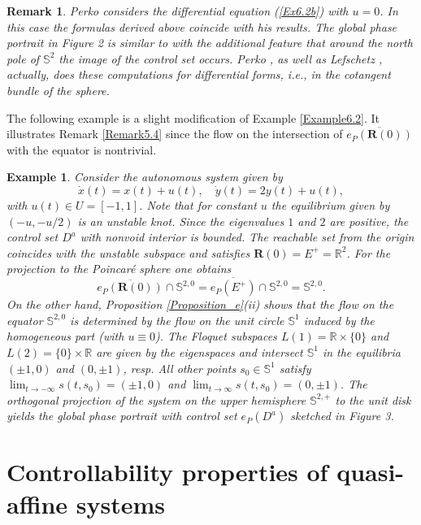 \documentclass{siamltex}%
\newtheorem{example}[theorem]{Example}
\newtheorem{remark}[theorem]{Remark}
\begin{document}
\begin{remark}
Perko \cite{Perko} considers the differential equation (\ref{Ex6.2b}) with
$u=0$. In this case the formulas derived above coincide with his results. The
global phase portrait in Figure 2 is similar to \cite[Figure 5 on p.
275]{Perko} with the additional feature that around the north pole of
$\mathbb{S}^{2}$ the image of the control set occurs. Perko \cite{Perko}, as
well as Lefschetz \cite[pp. 202]{Lefschetz}, actually, does these computations
for differential forms, i.e., in the cotangent bundle of the sphere.
\end{remark}

The following example is a slight modification of Example \ref{Example6.2}. It
illustrates Remark \ref{Remark5.4} since the flow on the intersection of
$\overline{e_{P}(\mathbf{R}(0))}$ with the equator is nontrivial.

\begin{example}
\label{Example6.3}Consider the autonomous system given by%
\[
\dot{x}(t)=x(t)+u(t),\quad\dot{y}(t)=2y(t)+u(t),
\]
with $u(t)\in U=[-1,1]$. Note that for constant $u$ the equilibrium given by
$(-u,-u/2)$ is an unstable knot. Since the eigenvalues $1$ and $2$ are
positive, the control set $D^{a}$ with nonvoid interior is bounded. The
reachable set from the origin coincides with the unstable subspace and
satisfies $\mathbf{R}(0)=E^{+}=\mathbb{R}^{2}$. For the projection to the
Poincar\'{e} sphere one obtains%
\[
\overline{e_{P}(\mathbf{R}(0))}\cap\mathbb{S}^{2,0}=\overline{e_{P}(E^{+}%
)}\cap\mathbb{S}^{2,0}=\mathbb{S}^{2,0}.
\]
On the other hand, Proposition \ref{Proposition_e}(ii) shows that the flow on
the equator $\mathbb{S}^{2,0}$ is determined by the flow on the unit circle
$\mathbb{S}^{1}$ induced by the homogeneous part (with $u\equiv0$). The
Floquet subspaces $L(1)=\mathbb{R}\times\{0\}$ and $L(2)=\{0\}\times
\mathbb{R}$ are given by the eigenspaces and intersect $\mathbb{S}^{1}$ in the
equilibria $(\pm1,0)$ and $(0,\pm1)$, resp. All other points $s_{0}%
\in\mathbb{S}^{1}$ satisfy $\lim_{t\rightarrow-\infty}s(t,s_{0})=(\pm1,0)$ and
$\lim_{t\rightarrow\infty}s(t,s_{0})=(0,\pm1)$. The orthogonal projection of
the system on the upper hemisphere $\mathbb{S}^{2,+}$ to the unit disk yields
the global phase portrait with control set $e_{P}(D^{a})$ sketched in Figure 3.
\end{example}

\section{Controllability properties of quasi-affine systems\label{Section7}}
\end{document}
